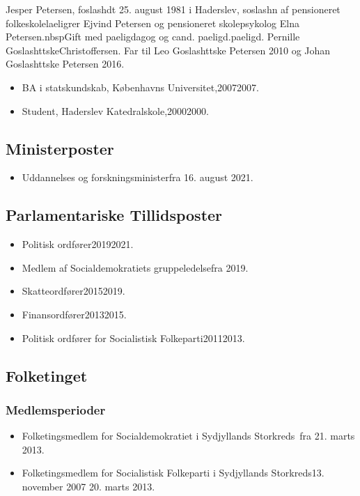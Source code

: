\documentclass[11pt, a4paper]{awesome-cv}
\begin{document}
\makecvheader[R]
\makelettertitle
\begin{cvletter}
Jesper Petersen, foslashdt 25. august 1981 i Haderslev, soslashn af pensioneret folkeskolelaeligrer Ejvind Petersen og pensioneret skolepsykolog Elna Petersen.nbspGift med paeligdagog og cand. paeligd.paeligd. Pernille GoslashttskeChristoffersen. Far til Leo Goslashttske Petersen 2010 og Johan Goslashttske Petersen 2016.

\begin{itemize}
\item BA i statskundskab, Københavns Universitet,20072007.
\item Student, Haderslev Katedralskole,20002000.
\end{itemize}
\subsection*{Ministerposter}
\begin{itemize}
\item Uddannelses og forskningsministerfra 16. august 2021.
\end{itemize}
\subsection*{Parlamentariske Tillidsposter}
\begin{itemize}
\item Politisk ordfører20192021.
\item Medlem af Socialdemokratiets gruppeledelsefra 2019.
\item Skatteordfører20152019.
\item Finansordfører20132015.
\item Politisk ordfører for Socialistisk Folkeparti20112013.
\end{itemize}
\subsection*{Folketinget}
\subsubsection*{Medlemsperioder}
\begin{itemize}
\item Folketingsmedlem for Socialdemokratiet i Sydjyllands Storkreds fra 21. marts 2013.
\item Folketingsmedlem for Socialistisk Folkeparti i Sydjyllands Storkreds13. november 2007  20. marts 2013.
\end{itemize}

\end{cvletter}
\end{document}
